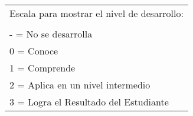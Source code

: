 \begin{table}[H]
	\centering
	\begin{tabular}{|p{\textwidth}|}
		\hline 
		Escala para mostrar el nivel de desarrollo: \\
		\\
		- = No se desarrolla\\
		0 = Conoce\\
		1 = Comprende\\
		2 = Aplica en un nivel intermedio\\
		3 = Logra el Resultado del Estudiante\\ \hline
		
	\end{tabular}
\end{table}
